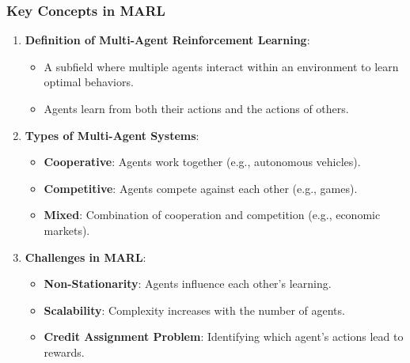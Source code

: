 \documentclass[aspectratio=169]{beamer}
\begin{document}
\begin{frame}[fragile]
    \frametitle{Key Concepts in MARL}
    \begin{enumerate}
        \item \textbf{Definition of Multi-Agent Reinforcement Learning}:
        \begin{itemize}
            \item A subfield where multiple agents interact within an environment to learn optimal behaviors.
            \item Agents learn from both their actions and the actions of others.
        \end{itemize}
        
        \item \textbf{Types of Multi-Agent Systems}:
        \begin{itemize}
            \item \textbf{Cooperative}: Agents work together (e.g., autonomous vehicles).
            \item \textbf{Competitive}: Agents compete against each other (e.g., games).
            \item \textbf{Mixed}: Combination of cooperation and competition (e.g., economic markets).
        \end{itemize}
        
        \item \textbf{Challenges in MARL}:
        \begin{itemize}
            \item \textbf{Non-Stationarity}: Agents influence each other's learning.
            \item \textbf{Scalability}: Complexity increases with the number of agents.
            \item \textbf{Credit Assignment Problem}: Identifying which agent's actions lead to rewards.
        \end{itemize}
    \end{enumerate}
\end{frame}
\end{document}
